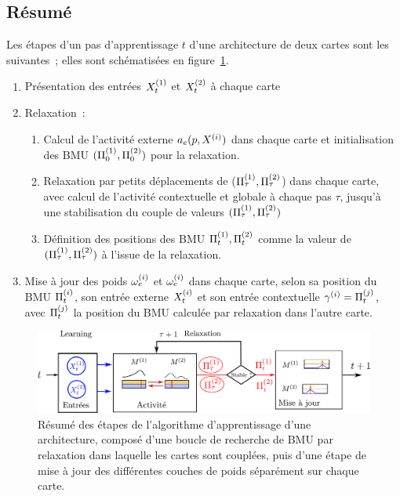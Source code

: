 \documentclass[../main]{subfiles}
\begin{document}
\subsection{Résumé}
Les étapes d'un pas d'apprentissage $t$ d'une architecture de deux cartes sont les suivantes~; elles sont schématisées en figure~\ref{fig:algo}.
\begin{enumerate}
\item Présentation des entrées $X^{({1})}_t$ et $X^{({2})}_t$ à chaque carte
\item Relaxation~:
\begin{enumerate}
\item Calcul de l'activité externe $a_e(p, X^{({i})})$ dans chaque carte et initialisation des BMU $(\Pi^{({1})}_0,\Pi^{({2})}_0)$ pour la relaxation.
\item Relaxation par petits déplacements de ($\Pi^{({1})}_\tau,\Pi^{({2})}_\tau$) dans chaque carte, avec calcul de l'activité contextuelle et globale à chaque pas $\tau$, jusqu'à une stabilisation du couple de valeurs $(\Pi^{({1})}_\tau,\Pi^{({2})}_\tau)$
\item Définition des positions des BMU $\Pi^{({1})}_t,\Pi^{({2})}_t$ comme la valeur de $(\Pi^{({1})}_\tau,\Pi^{({2})}_\tau)$ à l'issue de la relaxation.
\end{enumerate}
\item Mise à jour des poids $\omega_{e}^{({i})}$ et $\omega_{c}^{({i})}$ dans chaque carte, selon sa position du BMU $\Pi^{({i})}_t$, son entrée externe $X^{({i})}_t$ et son entrée contextuelle $ \gamma^{({i})} = \Pi^{({j})}_t$, avec $\Pi^{({j})}_t$ la position du BMU calculée par relaxation dans l'autre carte.
\end{enumerate}

\begin{figure}
\centering
\includegraphics[width=\textwidth]{learning_tests_2maps}
\caption{Résumé des étapes de l'algorithme d'apprentissage d'une architecture, composé d'une boucle de recherche de BMU par relaxation dans laquelle les cartes sont couplées, puis d'une étape de mise à jour des différentes couches de poids séparément sur chaque carte.}
\label{fig:algo}
\end{figure}
\end{document}
